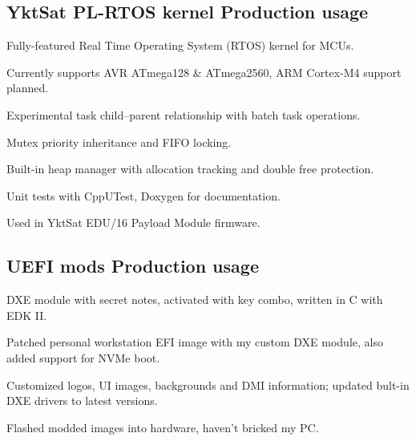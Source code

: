 \documentclass[letter,10pt]{article}
\begin{document}
\subsection{{YktSat PL-RTOS kernel \hfill Production usage}}
\begin{zitemize}
\item Fully-featured Real Time Operating System (RTOS) kernel for MCUs.
\item Currently supports AVR ATmega128 \& ATmega2560, ARM Cortex-M4 support planned.
\item Experimental task child--parent relationship with batch task operations.
\item Mutex priority inheritance and FIFO locking.
\item Built-in heap manager with allocation tracking and double free protection.
\item Unit tests with CppUTest, Doxygen for documentation.
\item Used in YktSat EDU/16 Payload Module firmware.
\end{zitemize}

\subsection{{UEFI mods \hfill Production usage}}
\begin{zitemize}
\item DXE module with secret notes, activated with key combo, written in C with EDK II.
\item Patched personal workstation EFI image with my custom DXE module, also added support for NVMe boot.
\item Customized logos, UI images, backgrounds and DMI information; updated bult-in DXE drivers to latest versions. 
\item Flashed modded images into hardware, haven't bricked my PC.
\end{zitemize}
\end{document}
